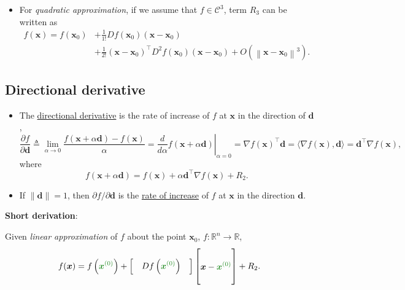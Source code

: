 \documentclass[12pt,thmsa]{article}
\begin{document}
\begin{itemize}
	\item For \textit{quadratic approximation}, if we assume that \(f \in \mathcal{C}^{3}\), term \(R_{3}\) can be written as
	\begin{align*}
		f(\boldsymbol{x})=f\left(\boldsymbol{x}_{0}\right)
		& + \frac{1}{1 !} D f\left(\boldsymbol{x}_{0}\right)\left(\boldsymbol{x}-\boldsymbol{x}_{0}\right) \\
		& + \frac{1}{2 !}\left(\boldsymbol{x}-\boldsymbol{x}_{0}\right)^{\top} D^{2} f\left(\boldsymbol{x}_{0}\right)\left(\boldsymbol{x}-\boldsymbol{x}_{0}\right)+O\left(\left\|\boldsymbol{x}-\boldsymbol{x}_{0}\right\|^{3}\right).
	\end{align*}

\end{itemize}


\subsection{Directional derivative}
\begin{itemize}
	\item The \underline{directional derivative} is the rate of increase of \(f\) at \(\boldsymbol{x}\) in the direction of \(\boldsymbol{d}\),
	\[
	\frac{\partial f}{\partial \boldsymbol{d}} \triangleq \lim _{\alpha \rightarrow 0} \frac{f(\boldsymbol{x}+\alpha \boldsymbol{d})-f(\boldsymbol{x})}{\alpha}
	=\left.\frac{d}{d \alpha} f(\boldsymbol{x}+\alpha \boldsymbol{d})\right|_{\alpha=0}
	=\nabla f(\boldsymbol{x})^{\top} \boldsymbol{d}
	=\langle\nabla f(\boldsymbol{x}), \boldsymbol{d}\rangle
	=\boldsymbol{d}^{\top} \nabla f(\boldsymbol{x}),
	\]where
	\[
	f(\boldsymbol{x}+\alpha \boldsymbol{d})
	=f(\boldsymbol{x})+\alpha \boldsymbol{d}^{\top} \nabla f(\boldsymbol{x})+R_{2}.
	\]
	
	\item If \(\|\boldsymbol{d}\|=1\), then \(\partial f / \partial \boldsymbol{d}\) is the \underline{rate of increase} of \(f\) at \(\boldsymbol{x}\) in the direction \(\boldsymbol{d}\).
\end{itemize}

\textbf{Short derivation}:

Given \textit{linear approximation} of \(f\) about the point \(\boldsymbol{x}_{0}\), \(f: \mathbb{R}^{n} \rightarrow \mathbb{R}\),
\[f(\boldsymbol{x})=f\left( { \color{forestgreen}{\boldsymbol{x}^{(0)}} } \right)+\left[\quad D f\left( { \color{forestgreen}{\boldsymbol{x}^{(0)}} } \right) \quad\right] 
\left[\begin{aligned} \\ \boldsymbol{x}-{ \color{forestgreen}{\boldsymbol{x}^{(0)}} } \\  \\\end{aligned}\right]
+R_{2}.
\]
\end{document}
